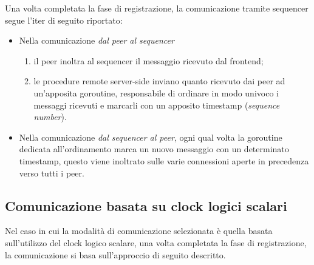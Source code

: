 \documentclass[conference]{IEEEtran}
\begin{document}
Una volta completata la fase di registrazione, la comunicazione tramite sequencer segue l'iter di seguito riportato:

\begin{itemize}
\item Nella comunicazione \textsl{dal peer al sequencer}
\begin{enumerate}
\item il peer inoltra al sequencer il messaggio ricevuto dal frontend; 
\item le procedure remote server-side inviano quanto ricevuto dai peer ad un'apposita goroutine, responsabile di ordinare in modo univoco i messaggi ricevuti e marcarli con un apposito timestamp (\textit{sequence number}).
\end{enumerate}

\item Nella comunicazione \textsl{dal sequencer al peer}, ogni qual volta la goroutine dedicata all'ordinamento marca un nuovo messaggio con un determinato timestamp, questo viene inoltrato sulle varie connessioni aperte in precedenza verso tutti i peer.
\end{itemize}

\subsection{Comunicazione basata su clock logici scalari}
Nel caso in cui la modalità di comunicazione selezionata è quella basata sull'utilizzo del clock logico scalare, una volta completata la fase di registrazione, la comunicazione si basa sull'approccio di seguito descritto.
\end{document}
